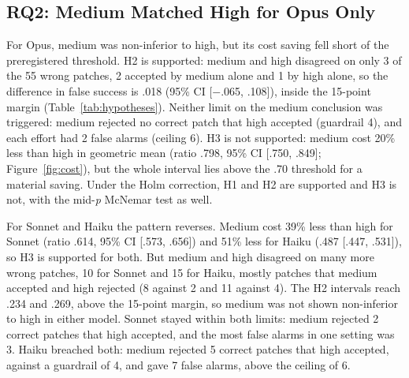 \documentclass[sigconf,nonacm]{acmart}
\begin{document}
\subsection{RQ2: Medium Matched High for Opus Only}\label{sec:rq2}

For Opus, medium was non-inferior to high, but its cost saving fell short of the preregistered threshold. H2 is supported: medium and high disagreed on only 3 of the 55 wrong patches, 2 accepted by medium alone and 1 by high alone, so the difference in false success is .018 (95\% CI [$-$.065, .108]), inside the 15-point margin (Table~\ref{tab:hypotheses}). Neither limit on the medium conclusion was triggered: medium rejected no correct patch that high accepted (guardrail 4), and each effort had 2 false alarms (ceiling 6). H3 is not supported: medium cost 20\% less than high in geometric mean (ratio .798, 95\% CI [.750, .849]; Figure~\ref{fig:cost}), but the whole interval lies above the .70 threshold for a material saving. Under the Holm correction, H1 and H2 are supported and H3 is not, with the mid-\textit{p} McNemar test as well.

For Sonnet and Haiku the pattern reverses. Medium cost 39\% less than high for Sonnet (ratio .614, 95\% CI [.573, .656]) and 51\% less for Haiku (.487 [.447, .531]), so H3 is supported for both. But medium and high disagreed on many more wrong patches, 10 for Sonnet and 15 for Haiku, mostly patches that medium accepted and high rejected (8 against 2 and 11 against 4). The H2 intervals reach .234 and .269, above the 15-point margin, so medium was not shown non-inferior to high in either model. Sonnet stayed within both limits: medium rejected 2 correct patches that high accepted, and the most false alarms in one setting was 3. Haiku breached both: medium rejected 5 correct patches that high accepted, against a guardrail of 4, and gave 7 false alarms, above the ceiling of 6.
\end{document}
